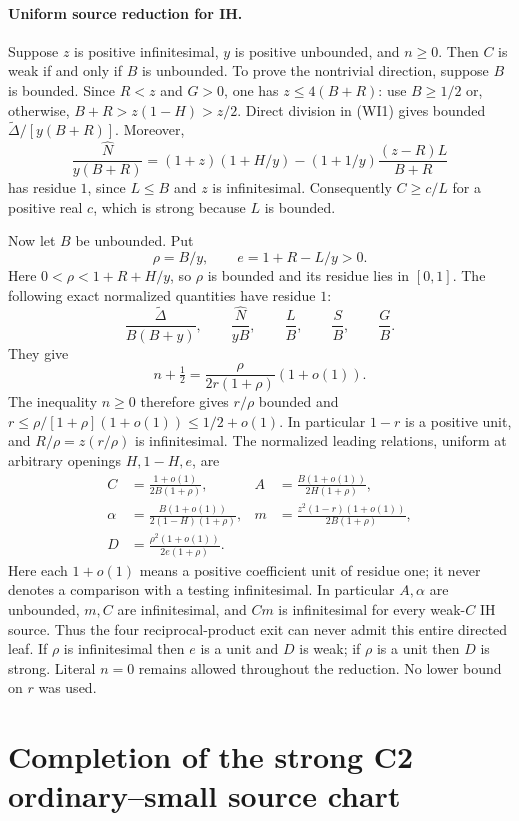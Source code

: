 \paragraph{Uniform source reduction for IH.}
Suppose $z$ is positive infinitesimal, $y$ is positive unbounded,
and $n\ge0$. Then $C$ is weak if and only if $B$ is unbounded.
To prove the nontrivial direction, suppose $B$ is bounded. Since
$R<z$ and $G>0$, one has $z\le4(B+R)$: use $B\ge1/2$
or, otherwise, $B+R>z(1-H)>z/2$. Direct division in (WI1)
gives bounded $\widetilde\Delta/[y(B+R)]$. Moreover,
\[
 \frac{\widehat N}{y(B+R)}
 =(1+z)(1+H/y)
 -(1+1/y)\frac{(z-R)L}{B+R}
\]
has residue $1$, since $L\le B$ and $z$ is infinitesimal.
Consequently $C\ge c/L$ for a positive real $c$, which is strong
because $L$ is bounded.

Now let $B$ be unbounded. Put
\[
 \rho=B/y,\qquad e=1+R-L/y>0.
\]
Here $0<\rho<1+R+H/y$, so $\rho$ is bounded and its residue
lies in $[0,1]$. The following exact normalized quantities have
residue $1$:
\[
 \frac{\widetilde\Delta}{B(B+y)},\qquad
 \frac{\widehat N}{yB},\qquad
 \frac{L}{B},\qquad \frac{S}{B},\qquad\frac{G}{B}.
                                                        \tag{WI2}
\]
They give
\[
 n+\tfrac12=\frac{\rho}{2r(1+\rho)}(1+o(1)).
\]
The inequality $n\ge0$ therefore gives $r/\rho$ bounded and
$r\le\rho/[1+\rho](1+o(1))\le1/2+o(1)$.
In particular $1-r$ is a positive unit, and
$R/\rho=z(r/\rho)$ is infinitesimal. The normalized leading
relations, uniform at arbitrary openings $H,1-H,e$, are
\begin{align*}
 C&=\frac{1+o(1)}{2B(1+\rho)},&
 A&=\frac{B(1+o(1))}{2H(1+\rho)},\\
 \alpha&=\frac{B(1+o(1))}{2(1-H)(1+\rho)},&
 m&=\frac{z^2(1-r)(1+o(1))}{2B(1+\rho)},\\
 D&=\frac{\rho^2(1+o(1))}{2e(1+\rho)}.
                                                        \tag{WI3}
\end{align*}
Here each $1+o(1)$ means a positive coefficient unit of residue one;
it never denotes a comparison with a testing infinitesimal. In
particular $A,\alpha$ are unbounded, $m,C$ are infinitesimal, and
$Cm$ is infinitesimal for every weak-$C$ IH source. Thus the four
reciprocal-product exit can never admit this entire directed leaf.
If $\rho$ is infinitesimal then $e$ is a unit and $D$ is weak;
if $\rho$ is a unit then $D$ is strong. Literal $n=0$ remains
allowed throughout the reduction. No lower bound on $r$ was used.



\section{\texorpdfstring{Completion of the strong C2 ordinary--small source chart}{Completion of the strong C2 ordinary--small source chart}}
\label{component:p6b22e944bd7c}

